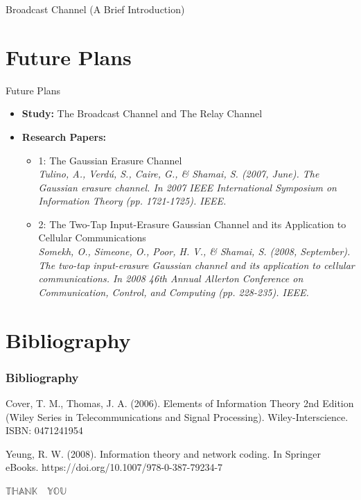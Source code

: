 \documentclass{beamer}
\newcommand{\red}[1]{{\color{red} #1}}
\newcommand{\blue}[1]{{\color{blue} #1}}
\begin{document}
{\begin{frame}{Broadcast Channel (A Brief Introduction)}
\begin{itemize}
	\end{itemize}
\end{frame}






\section{Future Plans}

\begin{frame}{Future Plans}
 \begin{itemize}
	\justifying

\item<1-> \textbf{\red {Study:}} The Broadcast Channel and The Relay Channel
\item<2-> \textbf{\blue{Research Papers:}}
\begin{itemize}
    \item 1: The Gaussian Erasure Channel \\
    \textit{\tiny Tulino, A., Verdú, S., Caire, G., & Shamai, S. (2007, June). The Gaussian erasure channel. In 2007 IEEE International Symposium on Information Theory (pp. 1721-1725). IEEE.}
    
    
    \item 2: The Two-Tap Input-Erasure Gaussian Channel and its Application to Cellular Communications\\
    \textit{\tiny Somekh, O., Simeone, O., Poor, H. V., \& Shamai, S. (2008, September). The two-tap input-erasure Gaussian channel and its application to cellular communications. In 2008 46th Annual Allerton Conference on Communication, Control, and Computing (pp. 228-235). IEEE.}
\end{itemize}

	\end{itemize}
\end{frame}

\section*{Bibliography}
\begin{frame}
\frametitle{Bibliography}
	\begin{thebibliography}{99}
	
 Cover, T. M., Thomas, J. A. (2006). Elements of Information Theory 2nd Edition (Wiley Series in Telecommunications and Signal Processing). Wiley-Interscience. ISBN: 0471241954

 Yeung, R. W. (2008). Information theory and network coding. In Springer eBooks. https://doi.org/10.1007/978-0-387-79234-7

\end{thebibliography}

\end{frame}
}
\begin{frame}
\centering
\color{red}\Huge $\mathbb{THANK \quad YOU}$
\end{frame}
\end{document}

